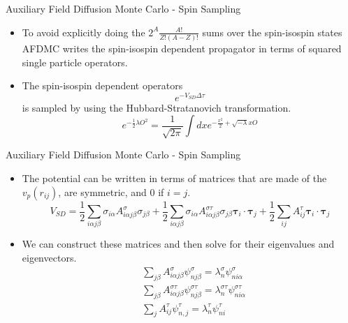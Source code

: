 \documentclass{beamer}
\newcommand{\dt}{\Delta\tau}
\newcommand{\ti}{\bm{\tau}_i}
\newcommand{\tj}{\bm{\tau}_j}
\begin{document}
\begin{frame}{Auxiliary Field Diffusion Monte Carlo - Spin Sampling}
\begin{itemize}
   \item To avoid explicitly doing the $2^A\frac{A!}{Z!(A-Z)!}$ sums over the spin-isospin states AFDMC writes the spin-isospin dependent propagator in terms of squared single particle operators.
   \item The spin-isospin dependent operators
   \begin{equation*}
      e^{-V_{SD}\dt}
   \end{equation*}
   is sampled by using the Hubbard-Stratanovich transformation.
   \begin{equation*}
      e^{-\frac{1}{2}\lambda O^2} = \frac{1}{\sqrt{2\pi}} \int dx e^{-\frac{x^2}{2} + \sqrt{-\lambda}xO}
   \end{equation*}
\end{itemize}
\end{frame}

\begin{frame}{Auxiliary Field Diffusion Monte Carlo - Spin Sampling}
\begin{itemize}
   \item The potential can be written in terms of matrices that are made of the $v_p(r_{ij})$, are symmetric, and 0 if $i=j$.
   \begin{equation*}
      V_{SD} = \frac{1}{2}\sum\limits_{i\alpha j\beta} \sigma_{i\alpha}A^{\sigma}_{i\alpha j\beta}\sigma_{j\beta}
      + \frac{1}{2}\sum\limits_{i\alpha j\beta} \sigma_{i\alpha}A^{\sigma\tau}_{i\alpha j\beta}\sigma_{j\beta}\ti\cdot\tj
      + \frac{1}{2}\sum\limits_{ij} A^{\tau}_{ij}\ti\cdot\tj
   \end{equation*}
   \item We can construct these matrices and then solve for their eigenvalues and eigenvectors.
\begin{align*}
   &\sum\limits_{j\beta} A^{\sigma}_{i\alpha j\beta}\psi^{\sigma}_{nj\beta} = \lambda^{\sigma}_n\psi^{\sigma}_{ni\alpha} \\
   &\sum\limits_{j\beta} A^{\sigma\tau}_{i\alpha j\beta}\psi^{\sigma\tau}_{n j\beta} = \lambda^{\sigma\tau}_n\psi^{\sigma\tau}_{ni\alpha} \\
   &\sum\limits_{j} A^{\tau}_{ij}\psi^{\tau}_{n,j} = \lambda^{\tau}_n\psi^{\tau}_{ni}
\end{align*}
\end{itemize}
\end{frame}
\end{document}
